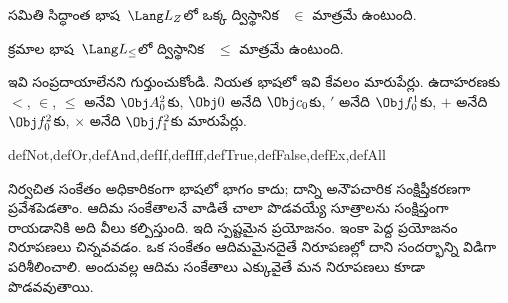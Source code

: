 \documentclass[../../../include/open-logic-section]{subfiles}
\begin{document}
\begin{ex}
సమితి సిద్ధాంత భాష~$\Lang L_Z$లో ఒక్క ద్విస్థానిక ~$\in$
మాత్రమే ఉంటుంది.
\end{ex}

\begin{ex}
క్రమాల భాష~$\Lang L_\le$లో ద్విస్థానిక ~$\le$ మాత్రమే
ఉంటుంది.
\end{ex}

ఇవి సంప్రదాయాలేనని గుర్తుంచుకోండి. నియత భాషలో ఇవి కేవలం
మారుపేర్లు. ఉదాహరణకు $<$, $\in$, $\le$ అనేవి $\Obj A^2_0$కు,
$\Obj 0$ అనేది $\Obj c_0$కు, $\prime$ అనేది $\Obj f^1_0$కు, $+$ అనేది
$\Obj f^2_0$కు, $\times$ అనేది $\Obj f^2_1$కు మారుపేర్లు.


\begin{tagblock}{defNot,defOr,defAnd,defIf,defIff,defTrue,defFalse,defEx,defAll}
\begin{explain}
నిర్వచిత సంకేతం అధికారికంగా భాషలో భాగం కాదు; దాన్ని అనౌపచారిక
సంక్షిప్తీకరణగా ప్రవేశపెడతాం. ఆదిమ సంకేతాలనే వాడితే చాలా పొడవయ్యే
సూత్రాలను సంక్షిప్తంగా రాయడానికి అది వీలు కల్పిస్తుంది. ఇది స్పష్టమైన
ప్రయోజనం. ఇంకా పెద్ద ప్రయోజనం నిరూపణలు చిన్నవవడం.
ఒక సంకేతం ఆదిమమైనదైతే నిరూపణల్లో దాని సందర్భాన్ని విడిగా
పరిశీలించాలి. అందువల్ల ఆదిమ సంకేతాలు ఎక్కువైతే మన నిరూపణలు కూడా
పొడవవుతాయి.
\end{explain}
\end{tagblock}

\end{document}
